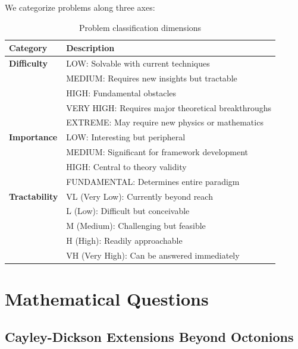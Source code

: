 We categorize problems along three axes:

\begin{table}[h]
\centering
\begin{tabular}{lp{10cm}}
\toprule
\textbf{Category} & \textbf{Description} \\
\midrule
\textbf{Difficulty} & LOW: Solvable with current techniques \\
& MEDIUM: Requires new insights but tractable \\
& HIGH: Fundamental obstacles \\
& VERY HIGH: Requires major theoretical breakthroughs \\
& EXTREME: May require new physics or mathematics \\
\midrule
\textbf{Importance} & LOW: Interesting but peripheral \\
& MEDIUM: Significant for framework development \\
& HIGH: Central to theory validity \\
& FUNDAMENTAL: Determines entire paradigm \\
\midrule
\textbf{Tractability} & VL (Very Low): Currently beyond reach \\
& L (Low): Difficult but conceivable \\
& M (Medium): Challenging but feasible \\
& H (High): Readily approachable \\
& VH (Very High): Can be answered immediately \\
\bottomrule
\end{tabular}
\caption{Problem classification dimensions}
\label{tab:problem_classification}
\end{table}

\section{Mathematical Questions}

\subsection{Cayley-Dickson Extensions Beyond Octonions}

